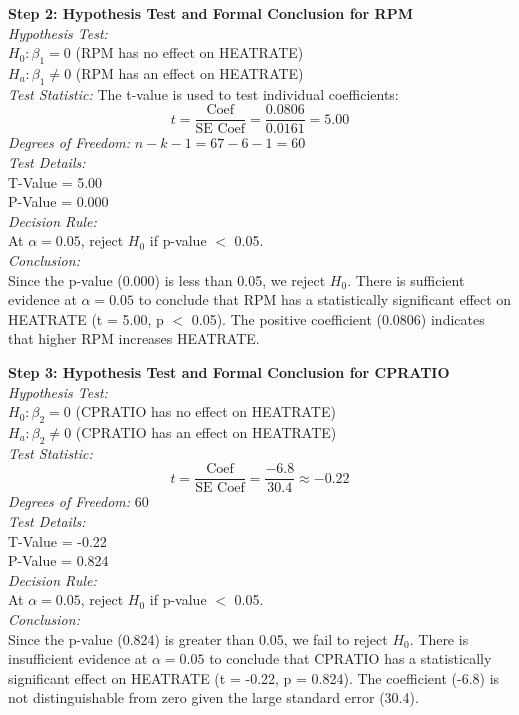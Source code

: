 \documentclass{article}
\begin{document}
\textbf{Step 2: Hypothesis Test and Formal Conclusion for RPM} \\
\textit{Hypothesis Test:} \\
\( H_0: \beta_1 = 0 \) (RPM has no effect on HEATRATE) \\
\( H_a: \beta_1 \neq 0 \) (RPM has an effect on HEATRATE) \\
\textit{Test Statistic:} The t-value is used to test individual coefficients:
\[
t = \frac{\text{Coef}}{\text{SE Coef}} = \frac{0.0806}{0.0161} = 5.00
\]
\textit{Degrees of Freedom:} \( n - k - 1 = 67 - 6 - 1 = 60 \) \\
\textit{Test Details:} \\
T-Value = 5.00 \\
P-Value = 0.000 \\
\textit{Decision Rule:} \\
At \( \alpha = 0.05 \), reject \( H_0 \) if p-value $<$ 0.05. \\
\textit{Conclusion:} \\
Since the p-value (0.000) is less than 0.05, we reject \( H_0 \). There is sufficient evidence at \( \alpha = 0.05 \) to conclude that RPM has a statistically significant effect on HEATRATE (t = 5.00, p $<$ 0.05). The positive coefficient (0.0806) indicates that higher RPM increases HEATRATE.

\textbf{Step 3: Hypothesis Test and Formal Conclusion for CPRATIO} \\
\textit{Hypothesis Test:} \\
\( H_0: \beta_2 = 0 \) (CPRATIO has no effect on HEATRATE) \\
\( H_a: \beta_2 \neq 0 \) (CPRATIO has an effect on HEATRATE) \\
\textit{Test Statistic:} 
\[
t = \frac{\text{Coef}}{\text{SE Coef}} = \frac{-6.8}{30.4} \approx -0.22
\]
\textit{Degrees of Freedom:} 60 \\
\textit{Test Details:} \\
T-Value = -0.22 \\
P-Value = 0.824 \\
\textit{Decision Rule:} \\
At \( \alpha = 0.05 \), reject \( H_0 \) if p-value $<$ 0.05. \\
\textit{Conclusion:} \\
Since the p-value (0.824) is greater than 0.05, we fail to reject \( H_0 \). There is insufficient evidence at \( \alpha = 0.05 \) to conclude that CPRATIO has a statistically significant effect on HEATRATE (t = -0.22, p = 0.824). The coefficient (-6.8) is not distinguishable from zero given the large standard error (30.4).
\end{document}
